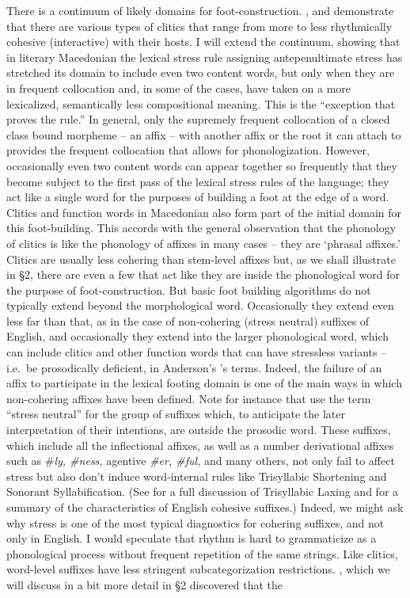 \documentclass[output=paper,
modfonts
]{LSP/langsci}
\begin{document}
There is a continuum of likely domains for foot-construction. \citet{selkirk1995}, \citet{peperkamp1997} and \citet{anderson2011} demonstrate that there are various types of clitics that range from more to less rhythmically cohesive (interactive) with their hosts. I will extend the continuum, showing that in literary Macedonian \citep{lunt1952,franks1987,franks1989} the lexical stress rule assigning antepenultimate stress has stretched its domain to include even two content words, but only when they are in frequent collocation and, in some of the cases, have taken on a more lexicalized, semantically less compositional meaning. This is the “exception that proves the rule.” In general, only the supremely frequent collocation of a closed class bound morpheme -- an affix -- with another affix or the root it can attach to provides the frequent collocation that allows for phonologization. However, occasionally even two content words can appear together so frequently that they become subject to the first pass of the lexical stress rules of the language; they act like a single word for the purposes of building a foot at the edge of a word. Clitics and function words in Macedonian also form part of the initial domain for this foot-building. This accords with the general observation that the phonology of clitics is like the phonology of affixes in many cases -- they are ‘phrasal affixes.’ \citep{anderson1992} Clitics are usually less cohering than stem-level affixes but, as we shall illustrate in §2, there are even a few that act like they are inside the phonological word for the purpose of foot-construction. But basic foot building algorithms do not typically extend beyond the morphological word. Occasionally they extend even less far than that, as in the case of non-cohering (stress neutral) suffixes of English, and occasionally they extend into the larger phonological word, which can include clitics and other function words that can have stressless variants  -- i.e.\ be prosodically deficient, in Anderson’s \citeyearpar{anderson2011}’s terms. Indeed, the failure of an affix to participate in the lexical footing domain is one of the main ways in which non-cohering affixes have been defined. Note for instance that \citet[84ff]{chomskyhalle1968} use the term “stress neutral” for the group of suffixes which, to anticipate the later interpretation of their intentions, are outside the prosodic word. These suffixes, which include all the inflectional affixes, as well as a number derivational affixes such as \#\textit{ly, \#ness,} agentive \textit{\#er, \#ful,} and many others, not only fail to affect stress but also don’t induce word-internal rules like Trisyllabic Shortening and Sonorant Syllabification. (See \citealt{kiparsky1982b} for a full discussion of Trisyllabic Laxing and \citealt{kaisse2005} for a summary of the characteristics of English cohesive suffixes.) Indeed, we might ask why stress is one of the most typical diagnostics for cohering suffixes, and not only in English. I would speculate that rhythm is hard to grammaticize as a phonological process without frequent repetition of the same strings. Like clitics, word-level suffixes have less stringent subcategorization restrictions. \citet{fabb1988}, which we will discuss in a bit more detail in §2 discovered that the 
\end{document}

